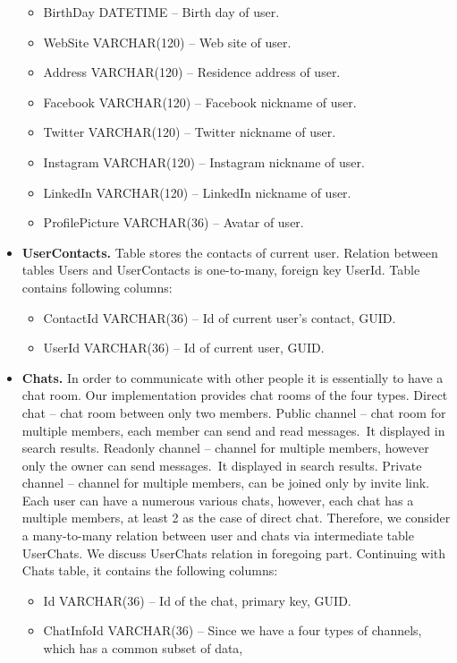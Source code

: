 \begin{itemize}
\begin{itemize}
        \item BirthDay DATETIME -- Birth day of user.
        \item WebSite VARCHAR(120) -- Web site of user.
        \item Address VARCHAR(120) -- Residence address of user.
        \item Facebook VARCHAR(120) -- Facebook nickname of user.
        \item Twitter VARCHAR(120) -- Twitter nickname of user.
        \item Instagram VARCHAR(120) -- Instagram nickname of user.
        \item LinkedIn VARCHAR(120) -- LinkedIn nickname of user.
        \item ProfilePicture VARCHAR(36) -- Avatar of user.
    \end{itemize}
    \item \textbf{UserContacts.} Table stores the contacts of current user.
    Relation between tables Users and UserContacts is one-to-many, foreign key UserId.
    Table contains following columns:
    \begin{itemize}
        \item ContactId VARCHAR(36) -- Id of current user's contact, GUID\@.
        \item UserId VARCHAR(36) -- Id of current user, GUID\@.
    \end{itemize}
    \item \textbf{Chats.} In order to communicate with other people it is essentially to have a chat room.
    Our implementation provides chat rooms of the four types.
    Direct chat -- chat room between only two members.
    Public channel -- chat room for multiple members, each member can send and read messages.\ It displayed in search results.
    Readonly channel -- channel for multiple members, however only the owner can send messages.\ It displayed in search results.
    Private channel -- channel for multiple members, can be joined only by invite link.
    Each user can have a numerous various chats, however, each chat has a multiple members, at least 2 as the case of direct chat.
    Therefore, we consider a many-to-many relation between user and chats via intermediate table UserChats.
    We discuss UserChats relation in foregoing part.
    Continuing with Chats table, it contains the following columns:
    \begin{itemize}
        \item Id VARCHAR(36) -- Id of the chat, primary key, GUID.
        \item ChatInfoId VARCHAR(36) -- Since we have a four types of channels, which has a common subset of data,

\end{itemize}
\end{itemize}
